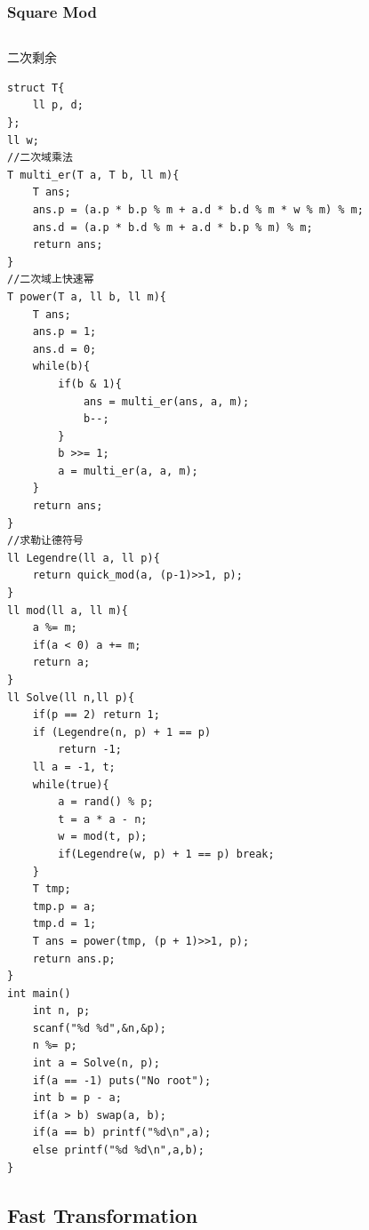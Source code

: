 \documentclass[twoside]{article}
\begin{document}
\subsubsection{Square Mod}
\begin{lstlisting}
\end{lstlisting}
二次剩余
\begin{lstlisting}
struct T{
    ll p, d;
};
ll w;
//二次域乘法
T multi_er(T a, T b, ll m){
    T ans;
    ans.p = (a.p * b.p % m + a.d * b.d % m * w % m) % m;
    ans.d = (a.p * b.d % m + a.d * b.p % m) % m;
    return ans;
}
//二次域上快速幂
T power(T a, ll b, ll m){
    T ans;
    ans.p = 1;
    ans.d = 0;
    while(b){
        if(b & 1){
            ans = multi_er(ans, a, m);
            b--;
        }
        b >>= 1;
        a = multi_er(a, a, m);
    }
    return ans;
}
//求勒让德符号
ll Legendre(ll a, ll p){
    return quick_mod(a, (p-1)>>1, p);
}
ll mod(ll a, ll m){
    a %= m;
    if(a < 0) a += m;
    return a;
}
ll Solve(ll n,ll p){
    if(p == 2) return 1;
    if (Legendre(n, p) + 1 == p)
        return -1;
    ll a = -1, t;
    while(true){
        a = rand() % p;
        t = a * a - n;
        w = mod(t, p);
        if(Legendre(w, p) + 1 == p) break;
    }
    T tmp;
    tmp.p = a;
    tmp.d = 1;
    T ans = power(tmp, (p + 1)>>1, p);
    return ans.p;
}
int main()
    int n, p;
    scanf("%d %d",&n,&p);
    n %= p;
    int a = Solve(n, p);
    if(a == -1) puts("No root");
    int b = p - a;
    if(a > b) swap(a, b);
    if(a == b) printf("%d\n",a);
    else printf("%d %d\n",a,b);
}\end{lstlisting}
\subsection{Fast Transformation}
\end{document}
